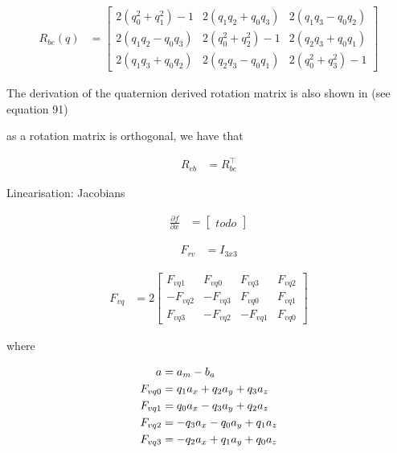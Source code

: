 \documentclass[]{article}
\begin{document}
{\begin{align}
	R_{be}(q) &=
	\left[
	\begin{matrix}
		2(q_0^2 + q_1^2) - 1 	& 2(q_1 q_2 + q_0 q_3) 	& 2(q_1 q_3 - q_0 q_2) \\
		2(q_1 q_2 - q_0 q_3) 	& 2(q_0^2 + q_2^2) - 1 	& 2(q_2 q_3 + q_0 q_1) \\
		2(q_1 q_3 + q_0 q_2)	& 2(q_2 q_3 - q_0 q_1)	& 2(q_0^2 + q_3^2) - 1
	\end{matrix}
	\right]
\end{align}

The derivation of the quaternion derived rotation matrix is also shown in \cite{MARSlab} (see equation 91)

as a rotation matrix is orthogonal, we have that

\begin{align}
	R_{eb} &= R_{be}^\top
\end{align}

Linearisation: Jacobians

\begin{align}
	\frac{\partial f}{\partial x} &=
	\left[
	\begin{matrix}
		todo
	\end{matrix}
	\right]
\end{align}

\begin{align}
	F_{rv} 	&= I_{3x3}
\end{align}

\begin{align}
	F_{vq} 	&= 2
	\left[
	\begin{matrix}
		F_{vq1} 	& F_{vq0} 	& F_{vq3} 	& F_{vq2} \\
		-F_{vq2} 	& -F_{vq3} 	& F_{vq0} 	& F_{vq1} \\
		F_{vq3} 	& -F_{vq2} 	& -F_{vq1} 	& F_{vq0}
	\end{matrix}
	\right]
\end{align}

where

\begin{align}
	a &= a_m - b_a 							\notag 	\\
	F_{vq0} &= q_1 a_x + q_2 a_y + q_3 a_z	\notag 	\\
	F_{vq1} &= q_0 a_x - q_3 a_y + q_2 a_z 	\notag	\\
	F_{vq2} &= -q_3 a_x - q_0 a_y + q_1 a_z \notag	\\
	F_{vq3} &= -q_2 a_x + q_1 a_y + q_0 a_z
\end{align}

}
\end{document}
